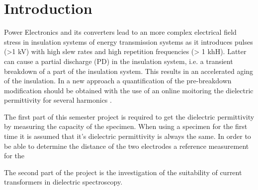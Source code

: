 
\chapter{Introduction}
Power Electronics and its converters lead to an more complex electrical field stress in insulation systems of energy transmission systems as it introduces pulses (>1 kV) with high slew rates and high repetition frequencies (> 1 khH). Latter can cause a partial discharge (PD) in the insulation system, i.e. a transient breakdown of a part of the insulation system. \cite{TransformerEngineering}
This results in an accelerated aging of the insulation. In a new approach a quantification of the pre-breakdown modification should be obtained with the use of an online moitoring the dielectric permittivity for several harmonics \cite{FaerberMVISS}.

The first part of this semester project is required to get the dielectric permittivity by measuring the capacity of the specimen. When using a specimen for the first time it is assumed that it's dielectric permittivity is always the same. In order to be able to determine the distance of the two electrodes a reference measurement for the 

The second part of the project is the investigation of the suitability of current transformers in dielectric spectroscopy. 

